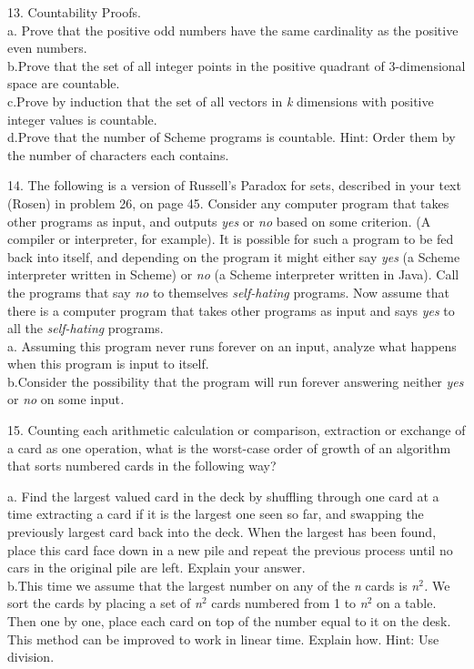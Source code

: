 \documentclass{article}
\newcommand{\tab}{\makebox[4em]{}}
\begin{document}
13.\tab 
Countability Proofs.\\
a.\tab 
Prove that the positive odd numbers have the same cardinality 
as the positive even numbers.\\
b.\tab Prove that the set of all integer points in the positive quadrant 
of 3-dimensional space are countable. \\
c.\tab Prove by induction that the set of all vectors in \textit{k} dimensions 
with positive integer values is countable.\\
d.\tab Prove that the number of Scheme programs is countable. Hint: 
Order them by the number of characters each contains.


14.\tab 
The following is a version of Russell's Paradox for sets, described 
in your text (Rosen) in problem 26, on page 45. Consider any 
computer program that takes other programs as input, and outputs \textit{yes} or \textit{no} 
based on some criterion. (A compiler or interpreter, for example). 
It is possible for such a program to be fed back into itself, 
and depending on the program it might either say \textit{yes} (a Scheme 
interpreter written in Scheme) or \textit{no} (a Scheme interpreter 
written in Java). Call the programs that say \textit{no} to themselves \textit{self-hating} programs. 
Now assume that there is a computer program that takes other 
programs as input and says \textit{yes} to all the \textit{self-hating} 
programs. \\
a.\tab 
Assuming this program never runs forever on an input, analyze 
what happens when this program is input to itself. \\
b.\tab Consider the possibility that the program will run forever 
answering neither \textit{yes} or \textit{no} on some input\textit{.}


15.\tab 
Counting each arithmetic calculation or comparison, extraction 
or exchange of a card as one operation, what is the worst-case 
order of growth of an algorithm that sorts numbered cards in 
the following way? 


a.\tab 
Find the largest valued card in the deck by shuffling through 
one card at a time extracting a card if it is the largest one 
seen so far, and swapping the previously largest card back into 
the deck. When the largest has been found, place this card face 
down in a new pile and repeat the previous process until no cars 
in the original pile are left. Explain your answer.\\
b.\tab This time we assume that the largest number on any of the \textit{n} cards 
is \textit{n}$^{\mathit{2}}$\textit{.} We sort the cards by placing a set of \textit{n}$^{\mathit{2}}$ 
cards numbered from 1 to \textit{n}$^{\mathit{2}}$ on a table. Then one by 
one, place each card on top of the number equal to it on the 
desk. This method can be improved to work in linear time. Explain 
how. Hint: Use division.
\end{document}
